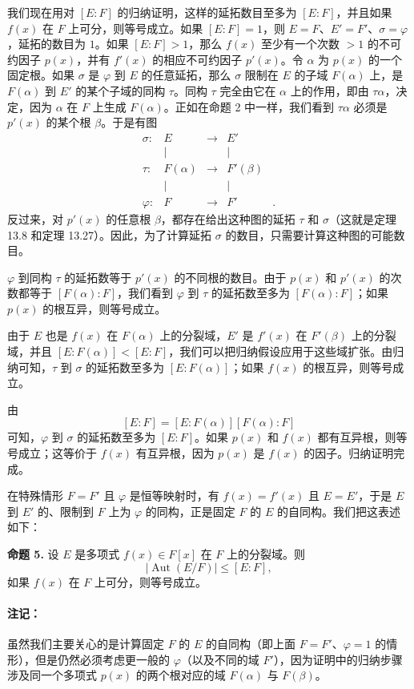 我们现在用对 $[E:F]$ 的归纳证明，这样的延拓数目至多为 $[E:F]$，并且如果 $f(x)$ 在 $F$ 上可分，则等号成立。如果 $[E:F]=1$，则 $E=F$、$E'=F'$、$\sigma=\varphi$，延拓的数目为 $1$。如果 $[E:F]>1$，那么 $f(x)$ 至少有一个次数 $>1$ 的不可约因子 $p(x)$，并有 $f'(x)$ 的相应不可约因子 $p'(x)$。令 $\alpha$ 为 $p(x)$ 的一个固定根。如果 $\sigma$ 是 $\varphi$ 到 $E$ 的任意延拓，那么 $\sigma$ 限制在 $E$ 的子域 $F(\alpha)$ 上，是 $F(\alpha)$ 到 $E'$ 的某个子域的同构 $\tau$。同构 $\tau$ 完全由它在 $\alpha$ 上的作用，即由 $\tau\alpha$，决定，因为 $\alpha$ 在 $F$ 上生成 $F(\alpha)$。正如在命题 2 中一样，我们看到 $\tau\alpha$ 必须是 $p'(x)$ 的某个根 $\beta$。于是有图
\[
\begin{array}{ccccc}
\sigma:& E & \longrightarrow & E'& \\
& | && |& \\
\tau:& F(\alpha)& \longrightarrow & F'(\beta)& \\
& | && |& \\
\varphi:& F & \longrightarrow & F'& .
\end{array}
\]
反过来，对 $p'(x)$ 的任意根 $\beta$，都存在给出这种图的延拓 $\tau$ 和 $\sigma$（这就是定理 13.8 和定理 13.27）。因此，为了计算延拓 $\sigma$ 的数目，只需要计算这种图的可能数目。

$\varphi$ 到同构 $\tau$ 的延拓数等于 $p'(x)$ 的不同根的数目。由于 $p(x)$ 和 $p'(x)$ 的次数都等于 $[F(\alpha):F]$，我们看到 $\varphi$ 到 $\tau$ 的延拓数至多为 $[F(\alpha):F]$；如果 $p(x)$ 的根互异，则等号成立。

由于 $E$ 也是 $f(x)$ 在 $F(\alpha)$ 上的分裂域，$E'$ 是 $f'(x)$ 在 $F'(\beta)$ 上的分裂域，并且 $[E:F(\alpha)]<[E:F]$，我们可以把归纳假设应用于这些域扩张。由归纳可知，$\tau$ 到 $\sigma$ 的延拓数至多为 $[E:F(\alpha)]$；如果 $f(x)$ 的根互异，则等号成立。

由
\[
[E:F]=[E:F(\alpha)][F(\alpha):F]
\]
可知，$\varphi$ 到 $\sigma$ 的延拓数至多为 $[E:F]$。如果 $p(x)$ 和 $f(x)$ 都有互异根，则等号成立；这等价于 $f(x)$ 有互异根，因为 $p(x)$ 是 $f(x)$ 的因子。归纳证明完成。

在特殊情形 $F=F'$ 且 $\varphi$ 是恒等映射时，有 $f(x)=f'(x)$ 且 $E=E'$，于是 $E$ 到 $E'$ 的、限制到 $F$ 上为 $\varphi$ 的同构，正是固定 $F$ 的 $E$ 的自同构。我们把这表述如下：

\noindent\textbf{命题 5.} 设 $E$ 是多项式 $f(x)\in F[x]$ 在 $F$ 上的分裂域。则
\[
|\operatorname{Aut}(E/F)|\leq [E:F],
\]
如果 $f(x)$ 在 $F$ 上可分，则等号成立。

\paragraph{注记：} 虽然我们主要关心的是计算固定 $F$ 的 $E$ 的自同构（即上面 $F=F'$、$\varphi=1$ 的情形），但是仍然必须考虑更一般的 $\varphi$（以及不同的域 $F'$），因为证明中的归纳步骤涉及同一个多项式 $p(x)$ 的两个根对应的域 $F(\alpha)$ 与 $F(\beta)$。

